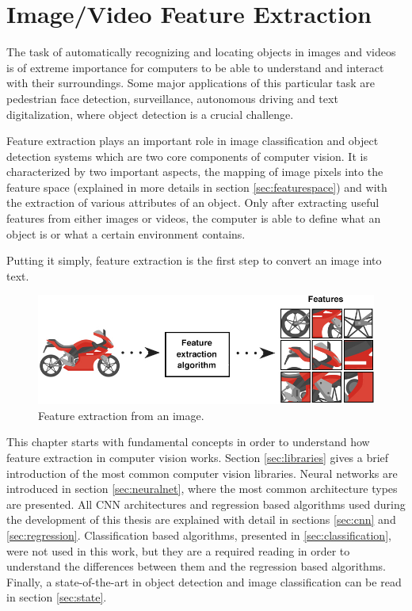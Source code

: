 \cleardoublepage


\chapter{Image/Video Feature Extraction }
\label{ch:computervision}

\par The task of automatically recognizing and locating objects in images and videos is of extreme importance for computers to be able to understand and interact with their surroundings. Some major applications of this particular task are pedestrian face detection, surveillance, autonomous driving and text digitalization, where object detection is a crucial challenge. \cite{Agarwal2019}


\par Feature extraction plays an important role in image classification and object detection systems which are two core components of computer vision. It is characterized by two important aspects, the mapping of image pixels into the feature space (explained in more details in section \ref{sec:featurespace}) and with the extraction of various attributes of an object. Only after extracting useful features from either images or videos, the computer is able to define what an object is or what a certain environment contains.\cite{Tiwari2013}

Putting it simply, feature extraction is the first step to convert an image into text.

\begin{figure}[htb]
    \centering
    \includegraphics[scale = 0.55]{Sections/2StateOfTheArt/2_images/Feature_extraction.png}
    \caption{Feature extraction from an image. \cite{feature} }  
\end{figure}


\par This chapter starts with fundamental concepts in order to understand how feature extraction in computer vision works. Section \ref{sec:libraries} gives a brief introduction of the most common computer vision libraries. Neural networks are introduced in section \ref{sec:neuralnet}, where the most common architecture types are presented. All CNN architectures and regression based algorithms used during the development of this thesis are explained with detail in sections \ref{sec:cnn} and \ref{sec:regression}. Classification based algorithms, presented in \ref{sec:classification}, were not used in this work, but they are a required reading in order to understand the differences between them and the regression based algorithms. Finally, a state-of-the-art in object detection and image classification can be read in section \ref{sec:state}.



